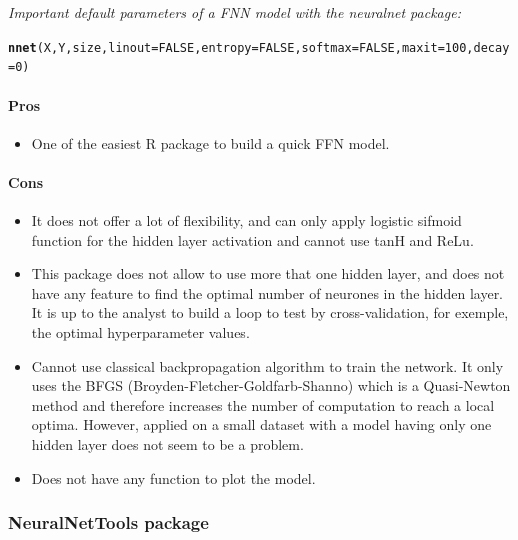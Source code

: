 \documentclass[letter]{article}\usepackage[]{graphicx}\usepackage[]{color}
\makeatletter
\newcommand{\hlnum}[1]{\textcolor[rgb]{0.686,0.059,0.569}{#1}}%
\newcommand{\hlstd}[1]{\textcolor[rgb]{0.345,0.345,0.345}{#1}}%
\newcommand{\hlkwc}[1]{\textcolor[rgb]{0.333,0.667,0.333}{#1}}%
\newcommand{\hlkwd}[1]{\textcolor[rgb]{0.737,0.353,0.396}{\textbf{#1}}}%
\newenvironment{kframe}{%
 \def\at@end@of@kframe{}%
 \ifinner\ifhmode%
  \def\at@end@of@kframe{\end{minipage}}%
  \begin{minipage}{\columnwidth}%
 \fi\fi%
 \def\FrameCommand##1{\hskip\@totalleftmargin \hskip-\fboxsep
 \colorbox{shadecolor}{##1}\hskip-\fboxsep
     \hskip-\linewidth \hskip-\@totalleftmargin \hskip\columnwidth}%
 \MakeFramed {\advance\hsize-\width
   \@totalleftmargin\z@ \linewidth\hsize
   \@setminipage}}%
 {\par\unskip\endMakeFramed%
 \at@end@of@kframe}
\newenvironment{knitrout}{}{} %
\makeatother
\begin{document}
\textit{Important default parameters of a FNN model with the neuralnet package:}
\begin{knitrout}
\color{fgcolor}\begin{kframe}
\begin{alltt}
\hlkwd{nnet}\hlstd{(X, Y, size,} \hlkwc{linout}\hlstd{=}\hlnum{FALSE}\hlstd{,} \hlkwc{entropy}\hlstd{=}\hlnum{FALSE}\hlstd{,} \hlkwc{softmax}\hlstd{=}\hlnum{FALSE}\hlstd{,} \hlkwc{maxit} \hlstd{=} \hlnum{100}\hlstd{,} \hlkwc{decay} \hlstd{=} \hlnum{0}\hlstd{)}
\end{alltt}
\end{kframe}
\end{knitrout}

\paragraph{Pros}
\begin{itemize}
\item One of the easiest R package to build a quick FFN model.
\end{itemize}
\paragraph{Cons}
\begin{itemize}
\item It does not offer a lot of flexibility, and can only apply logistic sifmoid function for the hidden layer activation and cannot use tanH and ReLu.
\item This package does not allow to use more that one hidden layer, and does not have any feature to find the optimal number of neurones in the hidden layer. It is up to the analyst to build a loop to test by cross-validation, for exemple, the optimal hyperparameter values.
\item Cannot use classical backpropagation algorithm to train the network. It only uses the BFGS (Broyden-Fletcher-Goldfarb-Shanno) which is a Quasi-Newton method and therefore increases the number of computation to reach a local optima. However, applied on a small dataset with a model having only one hidden layer does not seem to be a problem.
\item Does not have any function to plot the model.
\end{itemize}


\subsubsection{\textbf{NeuralNetTools package}}
\end{document}
